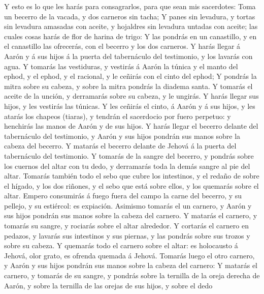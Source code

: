  Y esto es lo que les harás para consagrarlos, para que
sean mis sacerdotes: Toma un becerro de la vacada, y dos carneros sin
tacha;  Y panes sin levadura, y tortas sin levadura
amasadas con aceite, y hojaldres sin levadura untadas con aceite; las
cuales cosas harás de flor de harina de trigo:  Y las
pondrás en un canastillo, y en el canastillo las ofrecerás, con el
becerro y los dos carneros.  Y harás llegar á Aarón y á
sus hijos á la puerta del tabernáculo del testimonio, y los lavarás con
agua.  Y tomarás las vestiduras, y vestirás á Aarón la
túnica y el manto del ephod, y el ephod, y el racional, y le ceñirás con
el cinto del ephod;  Y pondrás la mitra sobre su cabeza, y
sobre la mitra pondrás la diadema santa.  Y tomarás el
aceite de la unción, y derramarás sobre su cabeza, y le ungirás.
 Y harás llegar sus hijos, y les vestirás las túnicas.
 Y les ceñirás el cinto, á Aarón y á sus hijos, y les
atarás los chapeos (tiaras), y tendrán el sacerdocio por fuero perpetuo:
y henchirás las manos de Aarón y de sus hijos.  Y harás
llegar el becerro delante del tabernáculo del testimonio, y Aarón y sus
hijos pondrán sus manos sobre la cabeza del becerro.  Y
matarás el becerro delante de Jehová á la puerta del tabernáculo del
testimonio.  Y tomarás de la sangre del becerro, y
pondrás sobre los cuernos del altar con tu dedo, y derramarás toda la
demás sangre al pie del altar.  Tomarás también todo el
sebo que cubre los intestinos, y el redaño de sobre el hígado, y los dos
riñones, y el sebo que está sobre ellos, y los quemarás sobre el altar.
 Empero consumirás á fuego fuera del campo la carne del
becerro, y su pellejo, y su estiércol: es expiación. 
Asimismo tomarás el un carnero, y Aarón y sus hijos pondrán sus manos
sobre la cabeza del carnero.  Y matarás el carnero, y
tomarás su sangre, y rociarás sobre el altar alrededor. 
Y cortarás el carnero en pedazos, y lavarás sus intestinos y sus
piernas, y las pondrás sobre sus trozos y sobre su cabeza.
 Y quemarás todo el carnero sobre el altar: es holocausto
á Jehová, olor grato, es ofrenda quemada á Jehová. 
Tomarás luego el otro carnero, y Aarón y sus hijos pondrán sus manos
sobre la cabeza del carnero:  Y matarás el carnero, y
tomarás de su sangre, y pondrás sobre la ternilla de la oreja derecha de
Aarón, y sobre la ternilla de las orejas de sus hijos, y sobre el dedo
